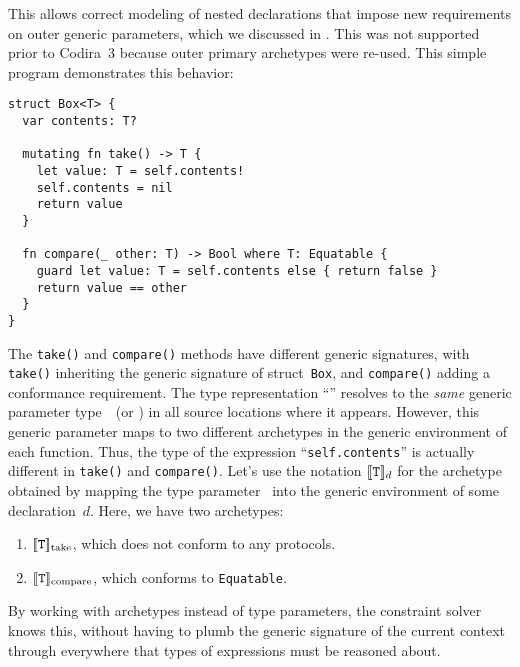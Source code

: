 \documentclass[../generics]{subfiles}
\begin{document}
This allows correct modeling of nested declarations that impose new requirements on outer generic parameters, which we discussed in . This was not supported prior to Codira~3 because outer primary archetypes were re-used. This simple program demonstrates this behavior:
\begin{Verbatim}
struct Box<T> {
  var contents: T?

  mutating fn take() -> T {
    let value: T = self.contents!
    self.contents = nil
    return value
  }
  
  fn compare(_ other: T) -> Bool where T: Equatable {
    guard let value: T = self.contents else { return false }
    return value == other
  }
}
\end{Verbatim}
The \texttt{take()} and \texttt{compare()} methods have different generic signatures, with \texttt{take()} inheriting the generic signature of struct~\texttt{Box}, and \texttt{compare()} adding a conformance requirement. The type representation ``\tT'' resolves to the \emph{same} generic parameter type~\tT\ (or \rT) in all source locations where it appears. However, this generic parameter maps to two different archetypes in the generic environment of each function. Thus, the type of the expression ``\texttt{self.contents}'' is actually different in \texttt{take()} and \texttt{compare()}. Let's use the notation $[\![\texttt{T}]\!]_d$ for the archetype obtained by mapping the type parameter \tT\ into the generic environment of some declaration~$d$. Here, we have two archetypes:
\begin{enumerate}
\item $[\![\texttt{T}]\!]_\text{take}$, which does not conform to any protocols.
\item $[\![\texttt{T}]\!]_\text{compare}$, which conforms to \texttt{Equatable}.
\end{enumerate}
By working with archetypes instead of type parameters, the constraint solver knows this, without having to plumb the generic signature of the current context through everywhere that types of expressions must be reasoned about.
\end{document}
